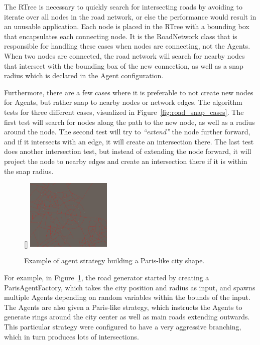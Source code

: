 The RTree is necessary to quickly search for intersecting roads by avoiding to iterate over all nodes in the road network, or else the performance would result in an unusable application.
Each node is placed in the RTree with a bounding box that encapsulates each connecting node.
It is the RoadNetwork class that is responsible for handling these cases when nodes are connecting, not the Agents.
When two nodes are connected, the road network will search for nearby nodes that intersect with the bounding box of the new connection, as well as a snap radius which is declared in the Agent configuration.

Furthermore, there are a few cases where it is preferable to not create new nodes for Agents, but rather snap to nearby nodes or network edges.
The algorithm tests for three different cases, visualized in Figure~\ref{fig:road_snap_cases}.
The first test will search for nodes along the path to the new node, as well as a radius around the node.
The second test will try to \textit{``extend''} the node further forward, and if it intersects with an edge, it will create an intersection there.
The last test does another intersection test, but instead of extending the node forward, it will project the node to nearby edges and create an intersection there if it is within the snap radius.

\begin{figure}
  \centering
  \raisebox{0pt}[\dimexpr{}\baselineskip\relax]{
    \includegraphics[width=0.36\textwidth]{figure/road_network_paris.png}
  }
  \caption{Example of agent strategy building a Paris-like city shape.}

  \label{fig:road_network_paris}
\end{figure}

For example, in Figure~\ref{fig:road_network_paris}, the road generator started by creating a ParisAgentFactory, which takes the city position and radius as input, and spawns multiple Agents depending on random variables within the bounds of the input.
The Agents are also given a Paris-like strategy, which instructs the Agents to generate rings around the city center as well as main roads extending outwards.
This particular strategy were configured to have a very aggressive branching, which in turn produces lots of intersections.

